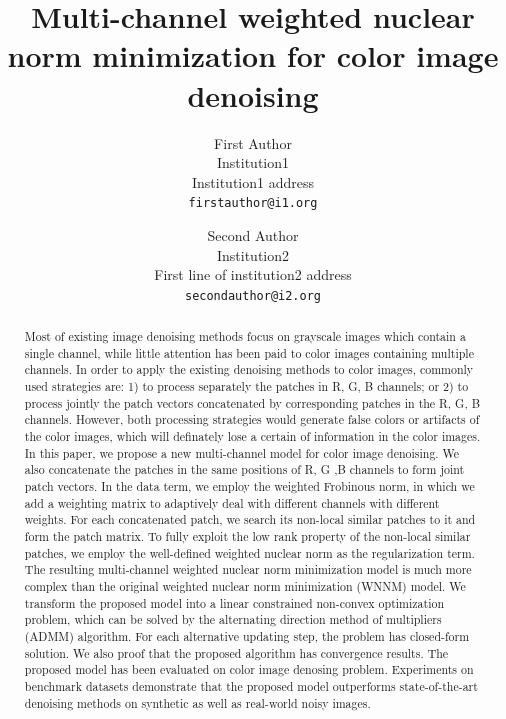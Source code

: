 \documentclass[10pt,twocolumn,letterpaper]{article}
\begin{document}
\title{Multi-channel weighted nuclear norm minimization for color image denoising}

\author{First Author\\
Institution1\\
Institution1 address\\
{\tt\small firstauthor@i1.org}
\and
Second Author\\
Institution2\\
First line of institution2 address\\
{\tt\small secondauthor@i2.org}
}

\maketitle

\begin{abstract}
Most of existing image denoising methods focus on grayscale images which contain a single channel, while little attention has been paid to color images containing multiple channels. In order to apply the existing denoising methods to color images, commonly used strategies are: 1) to process separately the patches in R, G, B channels; or 2) to process jointly the patch vectors concatenated by corresponding patches in the R, G, B channels. However, both processing strategies would generate false colors or artifacts of the color images, which will definately lose a certain of information in the color images.
In this paper, we propose a new multi-channel model for color image denoising. We also concatenate the patches in the same positions of R, G ,B channels to form joint patch vectors. In the data term, we employ the weighted Frobinous norm, in which we add a weighting matrix to adaptively deal with different channels with different weights. For each concatenated patch, we search its non-local similar patches to it and form the patch matrix. To fully exploit the low rank property of the non-local similar patches, we employ the well-defined weighted nuclear norm as the regularization term. The resulting multi-channel weighted nuclear norm minimization model is much more complex than the original weighted nuclear norm minimization (WNNM) model. We transform the proposed model into a linear constrained non-convex optimization problem, which can be solved by the alternating direction method of multipliers (ADMM) algorithm. For each alternative updating step, the problem has closed-form solution. We also proof that the proposed algorithm has convergence results. The proposed model has been evaluated on color image denosing problem. Experiments on benchmark datasets demonstrate that the proposed model outperforms state-of-the-art denoising methods on synthetic as well as real-world noisy images.
\end{abstract}
\end{document}
